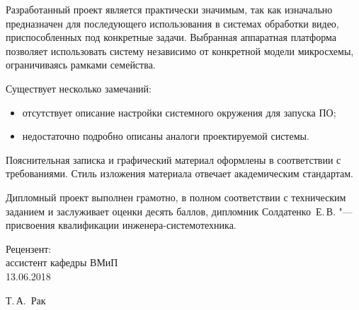 \begin{singlespace}
{Разработанный проект является практически значимым, так как изначально предназначен для последующего
использования в системах обработки видео, приспособленных под конкретные задачи. Выбранная аппаратная
платформа позволяет использовать систему независимо от конкретной модели микросхемы, ограничиваясь
рамками семейства.

Существует несколько замечаний:
\begin{itemize}
  \item отсутствует описание настройки системного окружения для запуска ПО;
  \item недостаточно подробно описаны аналоги проектируемой системы.
\end{itemize}

Пояснительная записка и графический материал оформлены в соответствии с требованиями. Стиль
изложения материала отвечает академическим стандартам.

Дипломный проект выполнен грамотно, в полном соответствии с техническим заданием и заслуживает оценки десять баллов,
дипломник Солдатенко~Е.\,В. "--- присвоения квалификации инженера-системотехника.

  \vfill
  \noindent
  \begin{minipage}{0.4\textwidth}
    \begin{flushleft}
      Рецензент:\\
      ассистент кафедры ВМиП \\
      13.06.2018
    \end{flushleft}
  \end{minipage}
  \begin{minipage}{0.58\textwidth}
    \begin{flushright}
    \underline{\hspace*{2cm}} Т.\,А.~Рак \\
    \end{flushright}
  \end{minipage}
}

\end{singlespace}
\clearpage